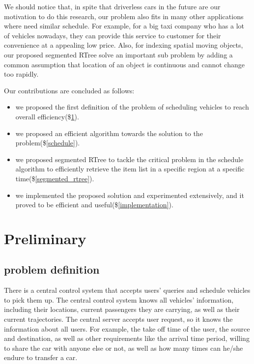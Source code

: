 \documentclass{vldb}
\begin{document}
We should notice that, in spite that driverless cars in the future are our motivation to do this research,
our problem also fits in many other applications where need similar schedule.
For example, for a big taxi company who has a lot of vehicles nowadays,
they can provide this service to customer for their convenience at a appealing low price.
Also, for indexing spatial moving objects,
our proposed segmented RTree solve an important sub problem
by adding a common assumption that location of an object is continuous and cannot change too rapidly.

Our contributions are concluded as follows:
\begin{itemize}
  \item we proposed the first definition of the problem of scheduling vehicles to reach overall efficiency(\$\ref{definition}).
  \item we proposed an efficient algorithm towards the solution to the problem(\$\ref{schedule}).
  \item we proposed segmented RTree to tackle the critical problem in the schedule algorithm
  to efficiently retrieve the item list in a specific region at a specific time(\$\ref{segmented_rtree}).
  \item we implemented the proposed solution and experimented extensively,
  and it proved to be efficient and useful(\$\ref{implementation}).
\end{itemize}




\section{Preliminary}
\label{definition}
\subsection{problem definition}
There is a central control system that accepts users' queries and schedule vehicles to pick them up.
The central control system knows all vehicles' information, including their locations,
current passengers they are carrying,
as well as their current trajectories.
The central server accepts user request, so it knows the information about all users.
For example, the take off time of the user, the source and destination,
as well as other requirements like the arrival time period,
willing to share the car with anyone else or not,
as well as how many times can he/she endure to transfer a car.
\end{document}

